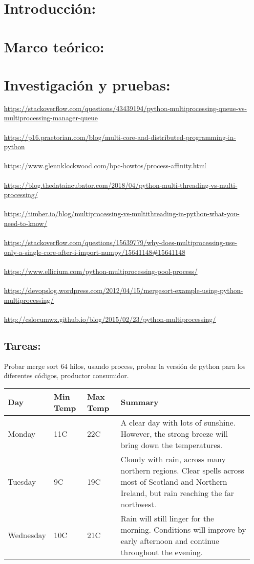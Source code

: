\section{Introducci\'on:}
\section{Marco te\'orico:}
\section{Investigaci\'on y pruebas:}
\url{https://stackoverflow.com/questions/43439194/python-multiprocessing-queue-vs-multiprocessing-manager-queue}\\\\
\url{https://p16.praetorian.com/blog/multi-core-and-distributed-programming-in-python}\\\\
\url{https://www.glennklockwood.com/hpc-howtos/process-affinity.html}\\\\
\url{https://blog.thedataincubator.com/2018/04/python-multi-threading-vs-multi-processing/}\\\\
\url{https://timber.io/blog/multiprocessing-vs-multithreading-in-python-what-you-need-to-know/}\\\\
\url{https://stackoverflow.com/questions/15639779/why-does-multiprocessing-use-only-a-single-core-after-i-import-numpy/15641148#15641148}\\\\
\url{https://www.ellicium.com/python-multiprocessing-pool-process/}\\\\
\url{https://devopslog.wordpress.com/2012/04/15/mergesort-example-using-python-multiprocessing/}\\\\
\url{http://cslocumwx.github.io/blog/2015/02/23/python-multiprocessing/}
\subsection{Tareas:}
Probar merge sort 64 hilos, usando process, probar la versi\'on de python para los diferentes c\'odigos, productor consumidor.
\begin{center}
    \begin{tabular}{ | l | l | l | p{5cm} |}
    \hline
    Day & Min Temp & Max Temp & Summary \\ \hline
    Monday & 11C & 22C & A clear day with lots of sunshine.
    However, the strong breeze will bring down the temperatures. \\ \hline
    Tuesday & 9C & 19C & Cloudy with rain, across many northern regions. Clear spells
    across most of Scotland and Northern Ireland,
    but rain reaching the far northwest. \\ \hline
    Wednesday & 10C & 21C & Rain will still linger for the morning.
    Conditions will improve by early afternoon and continue
    throughout the evening. \\
    \hline
    \end{tabular}
\end{center}

